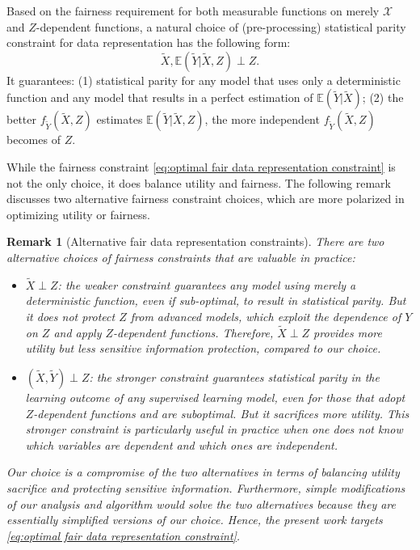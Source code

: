 \documentclass[twoside,11pt]{article}
\newtheorem{rema}{Remark}[section]{\bfseries}{\itshape}
\begin{document}
Based on the fairness requirement for both measurable functions on merely $\mathcal{X}$ and $Z$-dependent functions, a natural choice of (pre-processing) statistical parity constraint for data representation has the following form:
\begin{equation}\label{eq:optimal fair data representation constraint}
\tilde{X}, \mathbb{E}(\tilde{Y}|\tilde{X},Z) \perp Z.
\end{equation}
It guarantees: (1) statistical parity for any model that uses only a deterministic function and any model that results in a perfect estimation of $\mathbb{E}(\tilde{Y}|\tilde{X})$; (2) the better $f_{\tilde{Y}}(\tilde{X},Z)$ estimates $\mathbb{E}(\tilde{Y}|\tilde{X},Z)$, the more independent  $f_{\tilde{Y}}(\tilde{X},Z)$ becomes of $Z$. 

While the fairness constraint \eqref{eq:optimal fair data representation constraint} is not the only choice, it does balance utility and fairness. The following remark discusses two alternative fairness constraint choices, which are more polarized in optimizing utility or fairness.

\begin{rema}[Alternative fair data representation constraints]
There are two alternative choices of fairness constraints that are valuable in practice:
\begin{itemize}
\item[1] $\tilde{X} \perp Z$: the weaker constraint guarantees any model using merely a deterministic function, even if sub-optimal, to result in statistical parity. But it does not protect $Z$ from advanced models, which exploit the dependence of $Y$ on $Z$ and apply $Z$-dependent functions. Therefore, $\tilde{X} \perp Z$ provides more utility but less sensitive information protection, compared to our choice.
\item[2] $(\tilde{X},\tilde{Y}) \perp Z$: the stronger constraint guarantees statistical parity in the learning outcome of any supervised learning model, even for those that adopt $Z$-dependent functions and are suboptimal. But it sacrifices more utility. This stronger constraint is particularly useful in practice when one does not know which variables are dependent and which ones are independent.
\end{itemize}
Our choice is a compromise of the two alternatives in terms of balancing utility sacrifice and protecting sensitive information. Furthermore, simple modifications of our analysis and algorithm would solve the two alternatives because they are essentially simplified versions of our choice. Hence, the present work targets  \eqref{eq:optimal fair data representation constraint}.
\end{rema}
\end{document}
